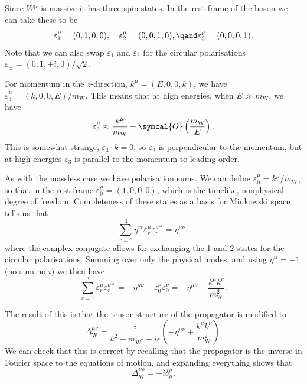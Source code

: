 \documentclass[fleqn]{NotesClass}
\newcommand{\Pparticle}[1]{\mathrm{#1}}
\newcommand{\PW}{\ensuremath{\Pparticle{W}}}
\newcommand{\order}{\symcal{O}}
\newcommand{\minkowskiMetric}{\eta}
\begin{document}
    Since \(W^\mu\) is massive it has three spin states.
    In the rest frame of the boson we can take these to be
    \begin{equation}
        \varepsilon_1^\mu = (0, 1, 0, 0), \quad \varepsilon_2^\mu = (0, 0, 1, 0), \qand \varepsilon_3^\mu = (0, 0, 0, 1).
    \end{equation}
    Note that we can also swap \(\varepsilon_1\) and \(\varepsilon_2\) for the circular polarisations \(\varepsilon_{\pm} = (0, 1, \pm i, 0)/\sqrt{2}\).
    
    For momentum in the \(z\)-direction, \(k^\mu = (E, 0, 0, k)\), we have \(\varepsilon_3^\mu = (k, 0, 0, E)/m_{\PW}\).
    This means that at high energies, when \(E \gg m_{\PW}\), we have
    \begin{equation}
        \varepsilon_3^\mu \approx \frac{k^\mu}{m_{\PW}} + \order\left( \frac{m_{\PW}}{E} \right).
    \end{equation}
    This is somewhat strange, \(\varepsilon_3 \cdot k = 0\), so \(\varepsilon_3\) is perpendicular to the momentum, but at high energies \(\varepsilon_3\) is parallel to the momentum to leading order.
    
    As with the massless case we have polarisation sums.
    We can define \(\varepsilon_0^\mu = k^\mu/m_{\PW}\), so that in the rest frame \(\varepsilon_0^\mu = (1, 0, 0, 0)\), which is the timelike, nonphysical degree of freedom.
    Completeness of these states as a basis for Minkowski space tells us that
    \begin{equation}
        \sum_{r = 0}^{3} \minkowskiMetric^{rr} \varepsilon_r^\mu \varepsilon_r^{\nu*} = \minkowskiMetric^{\mu\nu},
    \end{equation}
    where the complex conjugate allows for exchanging the 1 and 2 states for the circular polarisations.
    Summing over only the physical modes, and using \(\minkowskiMetric^{ii} = -1\) (no sum no \(i\)) we then have
    \begin{equation}
        \sum_{r = 1}^{3} \varepsilon_r^\mu \varepsilon_r^{\nu*} = -\minkowskiMetric^{\mu\nu} + \varepsilon_0^\mu\varepsilon_0^{\nu} = -\minkowskiMetric^{\mu\nu} + \frac{k^\mu k^\nu}{m_{\PW}^2}.
    \end{equation}
    
    The result of this is that the tensor structure of the propagator is modified to
    \begin{equation}
        \Delta_{\PW}^{\mu\nu} = \frac{i}{k^2 - m_{\PW^2} + i\epsilon} \left( -\minkowskiMetric^{\mu\nu} + \frac{k^\mu k^\nu}{m_{\PW}^2} \right).
    \end{equation}
    We can check that this is correct by recalling that the propagator is the inverse in Fourier space to the equations of motion, and expanding everything shows that
    \begin{equation}
        [(-k^2 + m_{\PW}^2)\minkowskiMetric_{\mu\nu} + k_\mu k_\nu]\Delta_{\PW}^{\nu\rho} = -i\delta^\rho_\mu.
    \end{equation}
    
%        
    
    \backmatter
    \printindex
\end{document}
